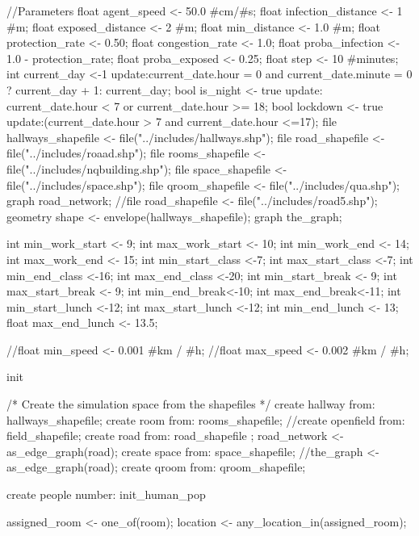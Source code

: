 \begin{verbatimtab}[4]
{       //Parameters 
        float agent_speed <- 50.0 #cm/#s;    
        float infection_distance <- 1 #m;
        float exposed_distance <- 2 #m;
        float min_distance <- 1.0 #m;
        float protection_rate <- 0.50;
        float congestion_rate <- 1.0;  
        float proba_infection <- 1.0 - protection_rate;
        float proba_exposed <- 0.25;
       float step <- 10 #minutes;
       int current_day <-1 update:current_date.hour = 0 and current_date.minute = 0 ? current_day + 1: current_day;
       bool is_night <- true update: current_date.hour < 7 or current_date.hour >= 18;
       bool lockdown <- true update:(current_date.hour > 7 and current_date.hour <=17);
        file hallways_shapefile <- file("../includes/hallways.shp");
        file road_shapefile <- file("../includes/roaad.shp");	
        file rooms_shapefile <- file("../includes/nqbuilding.shp");
        file space_shapefile <- file("../includes/space.shp");	
        file qroom_shapefile <- file("../includes/qua.shp");
        graph road_network;	
        //file road_shapefile <- file("../includes/road5.shp");		
        geometry shape <- envelope(hallways_shapefile);	
        graph the_graph;
        
        int min_work_start <- 9;
        int max_work_start <- 10;
        int min_work_end <- 14; 
        int max_work_end <- 15; 
        int min_start_class <-7;
        int max_start_class <-7;
        int min_end_class <-16;
        int max_end_class <-20;
        int min_start_break <- 9;
        int max_start_break <- 9;
        int min_end_break<-10;
        int max_end_break<-11;
        int min_start_lunch <-12;
        int max_start_lunch <-12;
        int min_end_lunch <- 13;
        float max_end_lunch <- 13.5;
        
        //float min_speed <- 0.001 #km / #h;
        //float max_speed <- 0.002 #km / #h;
        
        init {
            /* Create the simulation space from the shapefiles */
            create hallway from: hallways_shapefile;
            create room from: rooms_shapefile;
            //create openfield from: field_shapefile;
            create road from: road_shapefile ;
            road_network <- as_edge_graph(road);
            create space from: space_shapefile;
            //the_graph <- as_edge_graph(road);
            create qroom from: qroom_shapefile;
            
            create people number: init_human_pop {
                assigned_room <- one_of(room);
                   location <- any_location_in(assigned_room);
                   
}}}
\end{verbatimtab}
